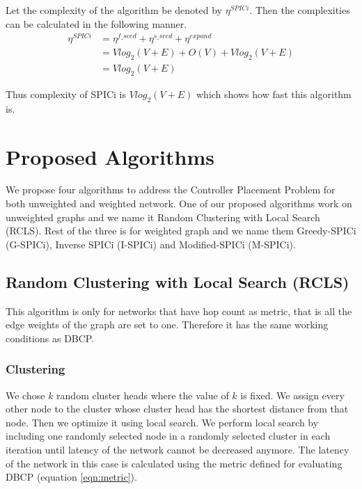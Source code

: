 \documentclass[a4paper,twocolumn,preprint]{elsarticle}
\begin{document}
Let the complexity of the algorithm be denoted by $\eta^{SPICi}$. Then the complexities can be calculated in the following manner.
\begin{equation}
\begin{split}
\eta^{SPICi} &= \eta^{f\_seed} + \eta^{s\_seed} + \eta^{expand}\\
&= Vlog_2(V+E) + O(V) + Vlog_2(V+E)\\
&=Vlog_2(V+E)
\end{split}
\end{equation}

Thus complexity of SPICi is $Vlog_2(V+E)$ which shows how fast this algorithm is.

\section{Proposed Algorithms} \label {proposedalgo}
We propose four algorithms to address the Controller Placement Problem for both unweighted and weighted network. One of our proposed algorithms work on unweighted graphs and we name it Random Clustering with Local Search (RCLS). Rest of the three is for weighted graph and we name them Greedy-SPICi (G-SPICi), Inverse SPICi (I-SPICi) and Modified-SPICi (M-SPICi).

\subsection{Random Clustering with Local Search (RCLS)}
This algorithm is only for networks that have hop count as metric, that is all the edge weights of the graph are set to one. Therefore it has the same working conditions as DBCP.
\subsubsection{Clustering} \label{rcls:clustering}
We chose $k$ random cluster heads where the value of $k$ is fixed. We assign every other node to the cluster whose cluster head has the shortest distance from that node. Then we optimize it using local search. We perform local search by including one randomly selected node in a randomly selected cluster in each iteration until latency of the network cannot be decreased anymore. The latency of the network in this case is calculated using the metric defined for evaluating DBCP (equation \ref{eqn:metric}).
\end{document}
